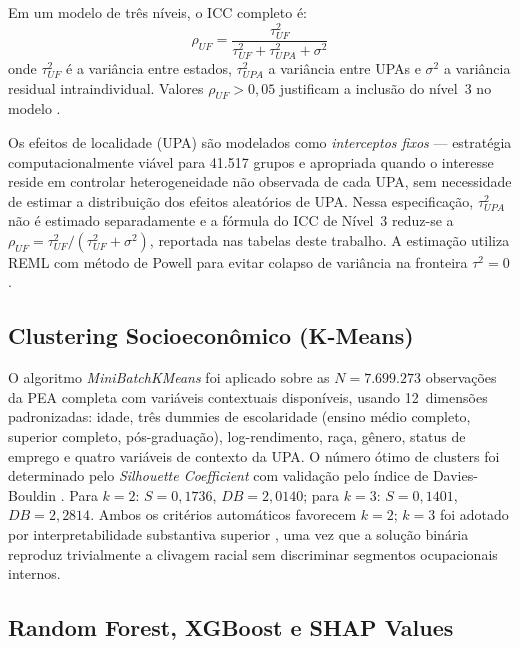 \documentclass[12pt, a4paper, oneside]{article}
\begin{document}
Em um modelo de três níveis, o ICC completo é:
\begin{equation}
  \rho_{UF} = \frac{\tau^2_{UF}}{\tau^2_{UF} + \tau^2_{UPA} + \sigma^2}
  \label{eq:icc}
\end{equation}
onde $\tau^2_{UF}$ é a variância entre estados, $\tau^2_{UPA}$ a variância
entre UPAs e $\sigma^2$ a variância residual intraindividual.
Valores $\rho_{UF} > 0{,}05$ justificam a inclusão do nível~3 no modelo
\cite{raudenbush2002}.

Os efeitos de localidade (UPA) são modelados como \textit{interceptos fixos}
--- estratégia computacionalmente viável para 41.517 grupos e apropriada quando
o interesse reside em controlar heterogeneidade não observada de cada UPA,
sem necessidade de estimar a distribuição dos efeitos aleatórios de UPA.
Nessa especificação, $\tau^2_{UPA}$ não é estimado separadamente e a
fórmula do ICC de Nível~3 reduz-se a $\rho_{UF} = \tau^2_{UF} / (\tau^2_{UF} + \sigma^2)$,
reportada nas tabelas deste trabalho.
A estimação utiliza REML com método de Powell
para evitar colapso de variância na fronteira $\tau^2=0$.

\subsection{Clustering Socioeconômico (K-Means)}

O algoritmo \textit{MiniBatchKMeans} foi aplicado sobre as
$N=7.699.273$ observações da PEA completa com variáveis contextuais
disponíveis, usando 12~dimensões padronizadas: idade, três dummies de
escolaridade (ensino médio completo, superior completo, pós-graduação),
log-rendimento, raça, gênero, status de emprego e quatro variáveis de
contexto da UPA. O número ótimo de clusters foi determinado pelo
\textit{Silhouette Coefficient} \cite{rousseeuw1987} com validação
pelo índice de Davies-Bouldin \cite{davies_bouldin1979}.
Para $k=2$: $S=0,1736$, $DB=2,0140$;
para $k=3$: $S=0,1401$, $DB=2,2814$.
Ambos os critérios automáticos favorecem $k=2$; $k=3$ foi adotado por
interpretabilidade substantiva superior \cite{ketchen1996}, uma vez que
a solução binária reproduz trivialmente a clivagem racial sem discriminar
segmentos ocupacionais internos.

\subsection{Random Forest, XGBoost e SHAP Values}
\end{document}
